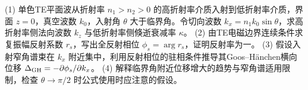 (1) 单色TE平面波从折射率 \(n_1>n_2>0\) 的高折射率介质入射到低折射率介质，界面 \(z=0\)，真空波数 \(k_0\)，入射角 \(\theta\) 大于临界角。令切向波数 \(k_x=n_1k_0\sin\theta\)，求高折射率侧法向波数 \(k_z\) 与低折射率侧倏逝衰减率 \(\kappa\)。
(2) 由TE电磁边界连续条件求复振幅反射系数 \(r_s\)，写出全反射相位 \(\phi_s=\arg r_s\)，证明反射率为一。
(3) 假设入射窄角谱束在 \(k_x\) 附近集中，利用反射相位的驻相条件推导其Goos–Hänchen横向位移 \(\Delta_{\rm GH}=-\partial\phi_s/\partial k_x\)。
(4) 解释临界角附近位移增大的趋势与窄角谱适用限制，检查 \(\theta\to\pi/2\) 时公式使用时应注意的假设。
